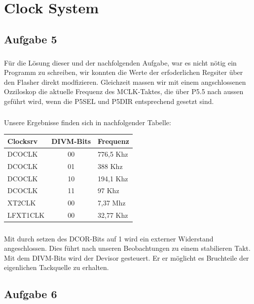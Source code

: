 \chapter{Clock System}

\section{Aufgabe 5}

\paragraph*{}
Für die Lösung dieser und der nachfolgenden Aufgabe, war es nicht nötig ein Programm zu schreiben, wir konnten die Werte der erfoderlichen Regsiter über den Flasher direkt modfizieren. Gleichzeit massen wir mit einem angschlossenen Ozziloskop die aktuelle Frequenz des MCLK-Taktes, die über P5.5 nach aussen geführt wird, wenn die P5SEL und P5DIR entsprechend gesetzt sind.

\paragraph*{}
Unsere Ergebnisse finden sich in nachfolgender Tabelle: \\

\begin{tabular}{ p{4cm} | c | p{4cm} }\hline \hline
Clocksrv & DIVM-Bits & Frequenz \\ \hline
DCOCLK & 00 & 776,5 Khz \\ \cline{2-3}
DCOCLK & 01 & 388 Khz \\ \cline{2-3}
DCOCLK & 10 & 194,1 Khz \\ \cline{2-3}
DCOCLK & 11 & 97 Khz \\ \hline
XT2CLK & 00 & 7,37 Mhz \\ \hline
LFXT1CLK & 00 & 32,77 Khz \\ \hline
\end{tabular}

\paragraph*{}
Mit durch setzen des DCOR-Bits auf 1 wird ein externer Widerstand angeschlossen. Dies führt nach unseren Beobachtungen zu einem stabilieren Takt. Mit dem DIVM-Bits wird der Devisor gesteuert. Er er möglicht es Bruchteile der eigenlichen Tackquelle zu erhalten. 

\section{Aufgabe 6}

